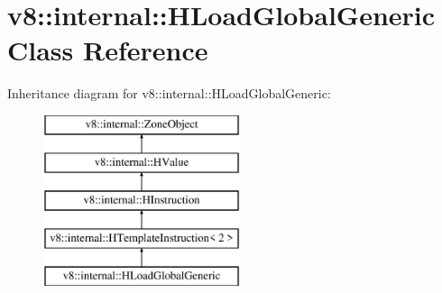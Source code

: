 \hypertarget{classv8_1_1internal_1_1_h_load_global_generic}{}\section{v8\+:\+:internal\+:\+:H\+Load\+Global\+Generic Class Reference}
\label{classv8_1_1internal_1_1_h_load_global_generic}
Inheritance diagram for v8\+:\+:internal\+:\+:H\+Load\+Global\+Generic\+:\begin{figure}[H]
\begin{center}
\leavevmode
\includegraphics[height=5.000000cm]{classv8_1_1internal_1_1_h_load_global_generic}
\end{center}
\end{figure}
